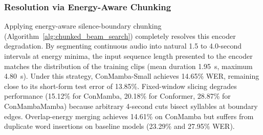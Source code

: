 \documentclass[journal]{IEEEtran}
\begin{document}
\subsubsection{Resolution via Energy-Aware Chunking}
Applying energy-aware silence-boundary chunking (Algorithm~\ref{alg:chunked_beam_search}) completely resolves this encoder degradation. By segmenting continuous audio into natural 1.5 to 4.0-second intervals at energy minima, the input sequence length presented to the encoder matches the distribution of the training clips (mean duration 1.95~s, maximum 4.80~s). Under this strategy, ConMamba-Small achieves 14.65\% WER, remaining close to its short-form test error of 13.85\%. Fixed-window slicing degrades performance (15.12\% for ConMamba, 20.18\% for Conformer, 28.87\% for ConMambaMamba) because arbitrary 4-second cuts bisect syllables at boundary edges. Overlap-energy merging achieves 14.61\% on ConMamba but suffers from duplicate word insertions on baseline models (23.29\% and 27.95\% WER).

\begin{table}[!t]
\centering
\caption{Architectural Component Ablation of ConMamba-Small Evaluated on the Curated EJUST Egyptian Arabic Dataset.}
\label{tab:arch_ablation}
\end{table}
\end{document}
